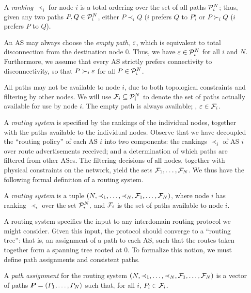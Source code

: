 \begin{defn}[Ranking]
A {\em ranking} $\prec_i$ for node $i$ is a total ordering
over the set of all paths $\P_i^N$; thus, given any
two paths $P,Q \in \P_i^N$, either $P \prec_i Q$ ($i$ prefers $Q$ to
$P$) or $P \succ_i Q$ ($i$ prefers $P$ to $Q$).  
\end{defn}

An AS may always choose the {\em empty
path}, $\eps$, which is equivalent to total disconnection from the
destination node $0$.  Thus, we have $\eps \in \P_i^N$ for all $i$ and
$N$.  Furthermore, we assume that every AS strictly prefers
connectivity to disconnectivity, so that $P \succ_i \eps$ for all $P
\in \P_i^N$.  

All paths may not be available to node $i$, due to both
topological constraints and filtering by other nodes.  We will use $\F_i
\subseteq \P_i^N$ to denote the set of paths 
actually available for use by node $i$.  The
empty path is always available; \ie, $\eps \in \F_i$.

A {\em routing system} is specified by the rankings of the individual
nodes, together with the paths available to the individual nodes.
Observe that we have decoupled the ``routing policy'' of
each AS $i$ into two components: the rankings $\prec_i$ of AS $i$
over route advertisements received; and a
determination of which paths are filtered from other ASes.  The
filtering decisions of all nodes, together with 
physical constraints on the network, yield the sets $\F_1, \ldots,
\F_N$.  
We thus have the following formal definition of a routing system.

\begin{defn}
\label{def:system}
A {\em routing system} is a tuple $(N, \prec_1, \ldots, \prec_N,
\F_1, \ldots, \F_N)$, where node $i$ has ranking
$\prec_i$ over the set $\P_i^N$, and $\F_i$ is the set of paths
available to node $i$.
\end{defn}

A routing system specifies the input to any interdomain routing protocol
we might consider.  Given this input, the protocol should converge
to a ``routing tree'': that is, an assignment of a path to each AS, such
that the routes taken together form a spanning tree rooted at $0$.  To
formalize this notion, we must define path assignments and consistent
paths.

\begin{defn}
A {\em path assignment} for the routing system $(N, \prec_1, \ldots,
\prec_N,\lb 
\F_1, \ldots, \F_N)$ is a vector of paths $\v{P} = (P_1, \ldots, P_N)$ such
that, for all $i$, $P_i \in \F_i$.
\end{defn}

